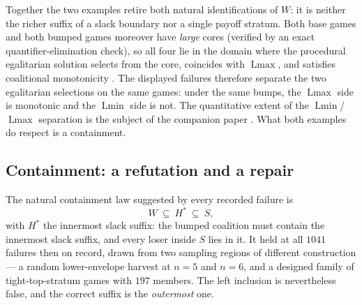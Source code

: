 \documentclass[11pt]{article}
\newcommand{\Lmin}{\operatorname{Lmin}}
\newcommand{\Lmax}{\operatorname{Lmax}}
\begin{document}
Together the two examples retire both natural identifications of $W$: it is
neither the richer suffix of a slack boundary nor a single payoff stratum.
Both base games and both bumped games moreover have \emph{large} cores
(verified by an exact quantifier-elimination check), so all four lie in the
domain where the procedural egalitarian solution selects from the core,
coincides with $\Lmax$, and satisfies coalitional monotonicity
\citep{Dietzenbacher2021,ArinKuipersVermeulen2003}.  The displayed failures
therefore separate the two egalitarian selections on the same games: under
the same bumps, the $\Lmax$ side is monotonic and the $\Lmin$ side is not.
The quantitative extent of the $\Lmin$/$\Lmax$ separation is the subject
of the companion paper \citep{Flanagan2026div}.
What both examples do respect is a containment.

\subsection{Containment: a refutation and a repair}

The natural containment law suggested by every recorded failure is
\begin{equation}\label{mono:eq:ccfalse}
 W\ \subseteq\ H^*\ \subseteq\ S ,
 \tag{C-C}
\end{equation}
with $H^*$ the innermost slack suffix: the bumped coalition must contain
the innermost slack suffix, and every loser inside $S$ lies in it.  It held
at all $1041$ failures then on record, drawn from two sampling regions of
different construction --- a random lower-envelope harvest at $n=5$ and
$n=6$, and a designed family of tight-top-stratum games with $197$
members.  The left inclusion is nevertheless false, and the correct suffix
is the \emph{outermost} one.
\end{document}
